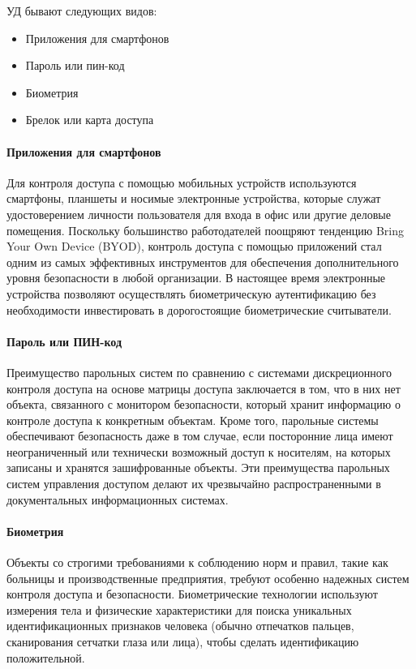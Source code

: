 УД бывают следующих видов:

\begin{itemize}
	\item Приложения для смартфонов
	\item Пароль или пин-код
	\item Биометрия
	\item Брелок или карта доступа
\end{itemize}

\paragraph{Приложения для смартфонов}

Для контроля доступа с помощью мобильных устройств используются смартфоны, планшеты и носимые электронные устройства, которые служат удостоверением личности пользователя для входа в офис или другие деловые помещения. Поскольку большинство работодателей поощряют тенденцию Bring Your Own Device (BYOD), контроль доступа с помощью приложений стал одним из самых эффективных инструментов для обеспечения дополнительного уровня безопасности в любой организации. В настоящее время электронные устройства позволяют осуществлять биометрическую аутентификацию без необходимости инвестировать в дорогостоящие биометрические считыватели.

\paragraph{Пароль или ПИН-код}

Преимущество парольных систем по сравнению с системами дискреционного контроля доступа на основе матрицы доступа заключается в том, что в них нет объекта, связанного с монитором безопасности, который хранит информацию о контроле доступа к конкретным объектам. Кроме того, парольные системы обеспечивают безопасность даже в том случае, если посторонние лица имеют неограниченный или технически возможный доступ к носителям, на которых записаны и хранятся зашифрованные объекты. Эти преимущества парольных систем управления доступом делают их чрезвычайно распространенными в документальных информационных системах.

\paragraph{Биометрия}

Объекты со строгими требованиями к соблюдению норм и правил, такие как больницы и производственные предприятия, требуют особенно надежных систем контроля доступа и безопасности. Биометрические технологии используют измерения тела и физические характеристики для поиска уникальных идентификационных признаков человека (обычно отпечатков пальцев, сканирования сетчатки глаза или лица), чтобы сделать идентификацию положительной. 

